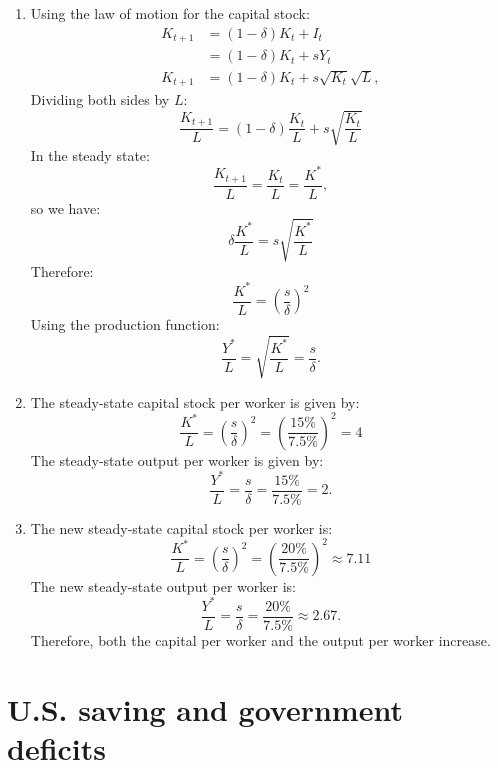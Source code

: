 \documentclass[]{book}
\begin{document}
\begin{enumerate}
\def\labelenumi{\arabic{enumi}.}
\item
  Using the law of motion for the capital stock: \[
  \begin{aligned}
  K_{t+1}&=(1-\delta)K_{t}+I_{t}\\
  &=(1-\delta)K_{t}+sY_{t}\\
  K_{t+1}&=(1-\delta)K_{t}+s\sqrt{K_{t}}\sqrt{L},
  \end{aligned}
  \] Dividing both sides by \(L\):
  \[\frac{K_{t+1}}{L}=(1-\delta)\frac{K_{t}}{L}+s\sqrt{\frac{K_{t}}{L}}\]
  In the steady state:
  \[\frac{K_{t+1}}{L}=\frac{K_{t}}{L}=\frac{K^{*}}{L},\] so we have:
  \[\delta\frac{K^{*}}{L}=s\sqrt{\frac{K^{*}}{L}}\] Therefore:
  \[\frac{K^{*}}{L}=\left(\frac{s}{\delta}\right)^{2}\] Using the
  production function:
  \[\frac{Y^{*}}{L}=\sqrt{\frac{K^{*}}{L}}=\frac{s}{\delta}.\]
\item
  The steady-state capital stock per worker is given by:
  \[\frac{K^{*}}{L}=\left(\frac{s}{\delta}\right)^{2}=\left(\frac{15\%}{7.5\%}\right)^{2}=4\]
  The steady-state output per worker is given by:
  \[\frac{Y^{*}}{L}=\frac{s}{\delta}=\frac{15\%}{7.5\%}=2.\]
\item
  The new steady-state capital stock per worker is:
  \[\frac{K^{*}}{L}=\left(\frac{s}{\delta}\right)^{2}=\left(\frac{20\%}{7.5\%}\right)^{2} \approx 7.11\]
  The new steady-state output per worker is:
  \[\frac{Y^{*}}{L}=\frac{s}{\delta}=\frac{20\%}{7.5\%} \approx 2.67.\]
  Therefore, both the capital per worker and the output per worker
  increase.
\end{enumerate}

\section{U.S. saving and government
deficits}\label{u.s.-saving-and-government-deficits-1}
\end{document}
